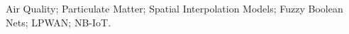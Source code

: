 \noindent Air Quality; Particulate Matter; Spatial Interpolation Models; Fuzzy Boolean Nets; LPWAN; NB-IoT.